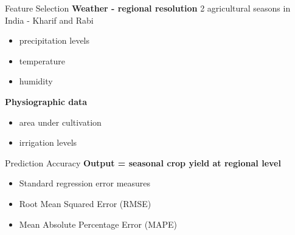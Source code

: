 \documentclass[10pt]{beamer}
\begin{document}
  \begin{frame}{Feature Selection}
  	\textbf{Weather - regional resolution}
  	2 agricultural seasons in India - Kharif and Rabi
  	\begin{itemize}	
  		\item precipitation levels
  		\item temperature
  		\item humidity
  	\end{itemize}
  	\textbf{Physiographic data}
  	\begin{itemize}
  		\item area under cultivation 
  		\item irrigation levels
  	\end{itemize}
  \end{frame}
  \begin{frame}{Prediction Accuracy}
  	\textbf{Output = seasonal crop yield at regional level}
  	\begin{itemize}
  		\item Standard regression error measures
  		\item Root Mean Squared Error (RMSE)
  		\item Mean Absolute Percentage Error (MAPE)
  	\end{itemize}
  \end{frame}
\end{document}
